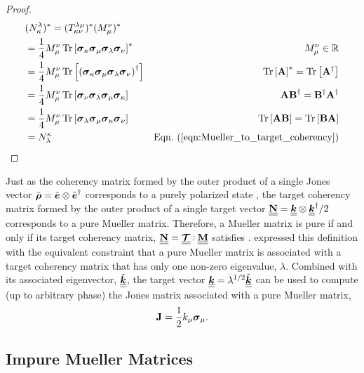 \begin{proof}
\begin{align*}
&(N_\jrow^{\jcol})^* = (T_{\jrow\icol}^{\jcol\irow})^* (M_\irow^\icol)^* \\
&= \frac{1}{4} M_\irow^\icol \, \tr{ \pauli{\jrow} \pauli{\irow} \pauli{\jcol} \pauli{\icol} }^* & M_\irow^\icol\in\mathbb{R} \\
&= \frac{1}{4} M_\irow^\icol \, \tr{ \left( \pauli{\jrow} \pauli{\irow} \pauli{\jcol} \pauli{\icol} \right)^\dagger } & \tr{\bf A}^* = \tr{{\bf A}^\dagger} \\
&= \frac{1}{4} M_\irow^\icol \, \tr{ \pauli{\icol}  \pauli{\jcol} \pauli{\irow} \pauli{\jrow}  } & {\bf AB}^\dagger = {\bf B}^\dagger {\bf A}^\dagger \\
&= \frac{1}{4} M_\irow^\icol \, \tr{ \pauli{\jcol} \pauli{\irow} \pauli{\jrow} \pauli{\icol} } & \tr{\bf AB} = \tr{\bf BA} \\
&= N_\jcol^\jrow  & \peqn{Mueller_to_target_coherency}
\end{align*}
\end{proof}

Just as the coherency matrix formed by the outer product of a single Jones vector
$\tilde{\mbox{\boldmath $\rho$}} = \hat{\mbox{\boldmath $e$}} \otimes \hat{\mbox{\boldmath $e$}}^\dagger$ corresponds to a purely polarized state
, the target coherency matrix formed by the outer product of a single target vector $\underline{\underline{{\bf N}}} = \underline{\underline{\mbox{\boldmath $k$}}} \otimes \underline{\underline{\mbox{\boldmath $k$}}}^\dagger / 2$ corresponds to a pure Mueller matrix.
%
Therefore, a Mueller matrix is pure if and only if 
its target coherency matrix, $\underline{\underline{{\bf N}}} = \underline{\underline{{\bf \mbox{\boldmath $\mathcal{T}$}}}} \mathbin{:} \underline{\underline{{\bf M}}}$ 
satisfies .
%
\cite{clo86} expressed this definition with the equivalent constraint that a pure Mueller matrix is associated with a target coherency matrix that has only one non-zero eigenvalue, $\lambda$.
%
Combined with its associated eigenvector, $\hat{\underline{\underline{\mbox{\boldmath $k$}}}}$,
the target vector $\underline{\underline{\mbox{\boldmath $k$}}} = \lambda^{1/2} \hat{\underline{\underline{\mbox{\boldmath $k$}}}}$ can be used to compute (up to arbitrary phase) the Jones matrix associated with a pure Mueller matrix,
%
\begin{equation}
{\bf J} = \frac{1}{2} k_\mu \mbox{\boldmath $\sigma$}_{\mu}.
\end{equation}

\subsection{Impure Mueller Matrices}
\label{app:impure}


